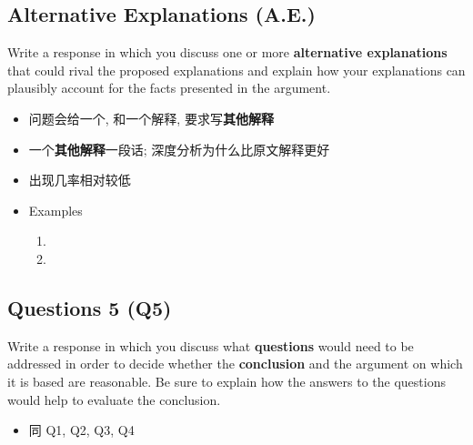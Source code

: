   \subsection{Alternative Explanations (A.E.)}

    Write a response in which you discuss one or more
    \textbf{alternative explanations} that could rival the proposed
    explanations and explain how your explanations can plausibly account for
    the facts presented in the argument.

    \begin{itemize}
      \item 问题会给一个, 和一个解释, 要求写\textbf{其他解释}
      \item 一个\textbf{其他解释}一段话; 深度分析为什么比原文解释更好
      \item 出现几率相对较低
      \item Examples
      \begin{enumerate}
        \item {}
        \item {}
      \end{enumerate}
    \end{itemize}

  \subsection{Questions 5 (Q5)}

    Write a response in which you discuss what \textbf{questions} would need
    to be addressed in order to decide whether the \textbf{conclusion} and the
    argument on which it is based are reasonable. Be sure to explain how the
    answers to the questions would help to evaluate the conclusion.

    \begin{itemize}
      \item 同 Q1, Q2, Q3, Q4
    \end{itemize}
